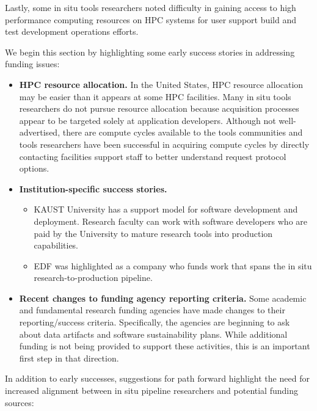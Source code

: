 \begin{refsection}
Lastly, some in situ tools researchers noted difficulty in gaining access to high performance computing resources on HPC systems for user support build and test development operations efforts.

 We begin this section by highlighting some early success stories in addressing  funding issues:

\begin{itemize}
\item \textbf{\sffamily HPC resource allocation.}  In the United States,  HPC resource allocation may be easier than it appears at some HPC facilities. Many in situ tools researchers do not pursue resource allocation because acquisition processes appear to be targeted solely at application developers.  Although not well-advertised, there are compute cycles available to the tools communities and tools researchers have been successful in acquiring compute cycles by directly contacting facilities support staff to better understand request protocol options.
\item  \textbf{\sffamily Institution-specific success stories.}
\begin{itemize}
\item KAUST University has a support model for software development and deployment.   Research faculty can work with software developers who are paid by the University to mature research tools into production capabilities.  
\item EDF was highlighted as a company who funds work that spans the in situ research-to-production pipeline.  
\end{itemize}
\item \textbf{\sffamily Recent changes to funding agency reporting criteria.} Some academic and fundamental research funding agencies have made changes to their reporting/success criteria. Specifically, the agencies are beginning to ask about data artifacts and software sustainability plans.  While additional funding is not being provided to support these activities, this is an important first step in that direction.
\end{itemize}

\noindent
In addition to early successes, suggestions for path forward highlight the need for increased alignment between in situ pipeline researchers and potential funding sources:


\end{refsection}
